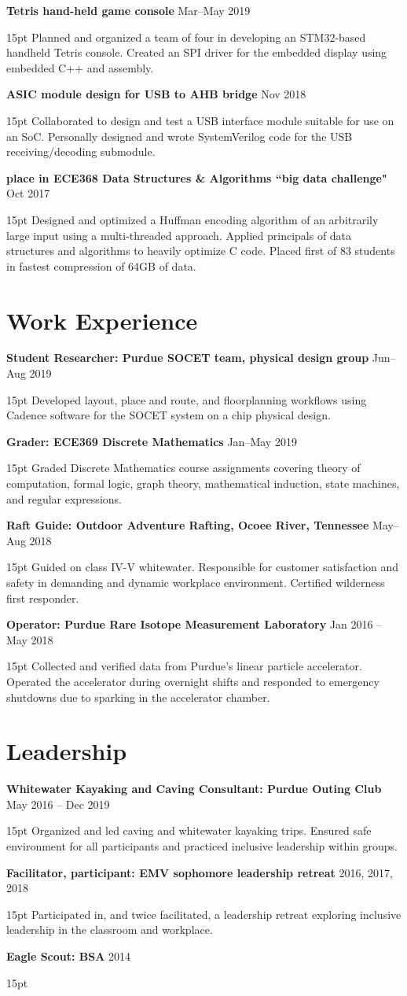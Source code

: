 \documentclass[10pt,letterpaper]{article}
\newcommand{\resumeItem}[3]{
	\textbf{#1} \hfill #2\\
	\begin{adjustwidth}{15pt}{}
	#3
	\end{adjustwidth}
}
\begin{document}
\resumeItem
{Tetris hand-held game console}
{Mar--May 2019}
{Planned and organized a team of four in developing an STM32-based handheld Tetris console. Created an SPI driver for the embedded display using embedded C++ and assembly.}

\resumeItem
{ASIC module design for USB to AHB bridge}
{Nov 2018}
{Collaborated to design and test a USB interface module suitable for use on an SoC. Personally designed and wrote SystemVerilog code for the USB receiving/decoding submodule.}

\resumeItem
{ place in ECE368 Data Structures \& Algorithms ``big data challenge"}
{Oct 2017}
{Designed and optimized a Huffman encoding algorithm of an arbitrarily large input using a multi-threaded approach. Applied principals of data structures and algorithms to heavily optimize C code. Placed first of 83 students in fastest compression of 64GB of data.}


\section*{Work Experience}
\resumeItem
{Student Researcher: Purdue SOCET team, physical design group}
{Jun--Aug 2019}
{Developed layout, place and route, and floorplanning workflows using Cadence software for the SOCET system on a chip physical design.}

\resumeItem
{Grader: ECE369 Discrete Mathematics}
{Jan--May 2019}
{Graded Discrete Mathematics course assignments covering theory of computation, formal logic, graph theory, mathematical induction, state machines, and regular expressions.}

\resumeItem
{Raft Guide: Outdoor Adventure Rafting, Ocoee River, Tennessee}
{May--Aug 2018}
{Guided on class IV-V whitewater. Responsible for customer satisfaction and safety in demanding and dynamic workplace environment. Certified wilderness first responder.}

\resumeItem
{Operator: Purdue Rare Isotope Measurement Laboratory}
{Jan 2016 -- May 2018}
{Collected and verified data from Purdue's linear particle accelerator. Operated the accelerator during overnight shifts and responded to emergency shutdowns due to sparking in the accelerator chamber.}


\section*{Leadership}
\resumeItem
{Whitewater Kayaking and Caving Consultant: Purdue Outing Club}
{May 2016 -- Dec 2019}
{Organized and led caving and whitewater kayaking trips. Ensured safe environment for all participants and practiced inclusive leadership within groups.}

\resumeItem
{Facilitator, participant: EMV sophomore leadership retreat}
{2016, 2017, 2018}
{Participated in, and twice facilitated, a leadership retreat exploring inclusive leadership in the classroom and workplace.}

\resumeItem
{Eagle Scout: BSA}
{2014}
{}
\end{document}
